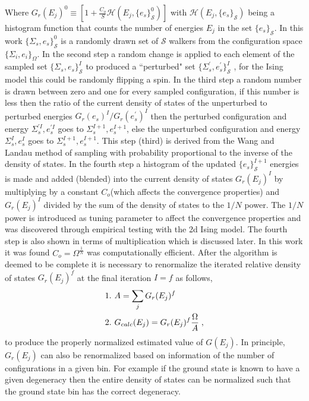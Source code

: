 \documentclass[aps,pre,reprint,superscriptaddress,showkeys]{revtex4-1}
\begin{document}
Where  $G_{r}(E_j)^0 \equiv [1 +  \frac{C_o}{S}\mathcal{H}(E_j,\{e_s\}_{\mathcal{S}}^0)]$ with $\mathcal{H}(E_j,\{e_s\}_{\mathcal{S}})$ being a histogram function that counts the number of energies $E_j$ in the set $\{e_s\}_{\mathcal{S}}$. In this work $\{\Sigma_{s},e_s\}_{\mathcal{S}}^0$  is a randomly drawn set of $\mathcal{S}$ walkers from the configuration space $\{ \Sigma_i, e_i \}_\Omega $. In the second step  a random change is applied to each element of the sampled set $\{\Sigma_{s},e_s\}_{\mathcal{S}}^I$ to produced a ``perturbed" set $ \{\Sigma_{s}^{'},e_s^{'}\}_{\mathcal{S}}^I$ , for the Ising model this could be randomly flipping a spin.  In the third step a random number is drawn between zero and one for every sampled configuration, if this number is less then the ratio of the current density of states of the unperturbed to perturbed energies $G_{r}(e_s)^{I}/G_{r}(e_s^{'})^{I}$ then the perturbed configuration and energy  $\Sigma_{s}^{'I},e_s^{'I}$  goes to $\Sigma_{s}^{I+1},e_s^{I+1}$,  else the unperturbed configuration and energy $\Sigma_{s}^{I},e_s^I$  goes to $\Sigma_{s}^{I+1},e_s^{I+1}$. This step (third) is derived from the Wang and Landau method of sampling with probability proportional to the inverse of the density of states.  In the fourth step a histogram of the updated $\{ e_s \}^{I+1}_{\mathcal{S}}$ energies is made and added (blended) into the current density of states $G_{r}(E_j)^I$   by multiplying  by a constant $C_{o}$(which affects the convergence properties) and   $G_{r}(E_j)^{I}$ divided by the sum of the density of states to the $1/N$ power. The $1/N$ power is introduced as tuning parameter to affect the convergence properties and was discovered through empirical testing with the 2d Ising model.  The fourth step is also shown in terms of multiplication which is discussed later. In this work it was found  $C_{o}=\Omega^{\frac{1}{N}}$ was computationally efficient. After the algorithm is deemed to be complete it is necessary to renormalize the iterated relative density of states $G_{r}(E_j)^f$ at the final iteration $I=f$ as follows, 
\begin{equation}
\begin{split}
&1. \hspace{0.125cm} A = \sum_jG_{r}(E_j)^f\\
&2. \hspace{0.125cm} G_{calc}(E_j) = G_{r}(E_j)^f \frac{\Omega}{A} \;,
\end{split}
\label{renormalize}
\end{equation}
to produce the properly normalized estimated value of $G(E_j)$. In principle, $G_{r}(E_j)$ can also be renormalized based on information of the number of configurations in a given bin. For example if the ground state is known to have a given degeneracy then the entire density of states can be normalized such that the ground state bin has the correct degeneracy. 
\end{document}
